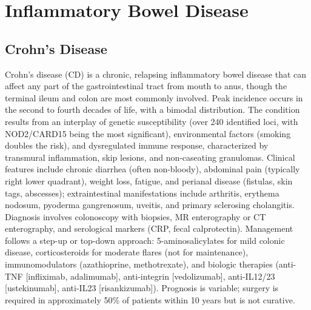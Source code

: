 \section{Inflammatory Bowel Disease}








\label{sec:Inflammatory Bowel Disease}

\subsection{Crohn's Disease}
\label{sec:Crohn's Disease}
Crohn's disease (CD) is a chronic, relapsing inflammatory bowel disease that can affect any part of the gastrointestinal tract from mouth to anus, though the terminal ileum and colon are most commonly involved. Peak incidence occurs in the second to fourth decades of life, with a bimodal distribution. The condition results from an interplay of genetic susceptibility (over 240 identified loci, with NOD2/CARD15 being the most significant), environmental factors (smoking doubles the risk), and dysregulated immune response, characterized by transmural inflammation, skip lesions, and non-caseating granulomas. Clinical features include chronic diarrhea (often non-bloody), abdominal pain (typically right lower quadrant), weight loss, fatigue, and perianal disease (fistulas, skin tags, abscesses); extraintestinal manifestations include arthritis, erythema nodosum, pyoderma gangrenosum, uveitis, and primary sclerosing cholangitis. Diagnosis involves colonoscopy with biopsies, MR enterography or CT enterography, and serological markers (CRP, fecal calprotectin). Management follows a step-up or top-down approach: 5-aminosalicylates for mild colonic disease, corticosteroids for moderate flares (not for maintenance), immunomodulators (azathioprine, methotrexate), and biologic therapies (anti-TNF [infliximab, adalimumab], anti-integrin [vedolizumab], anti-IL12/23 [ustekinumab], anti-IL23 [risankizumab]). Prognosis is variable; surgery is required in approximately 50\% of patients within 10 years but is not curative.

